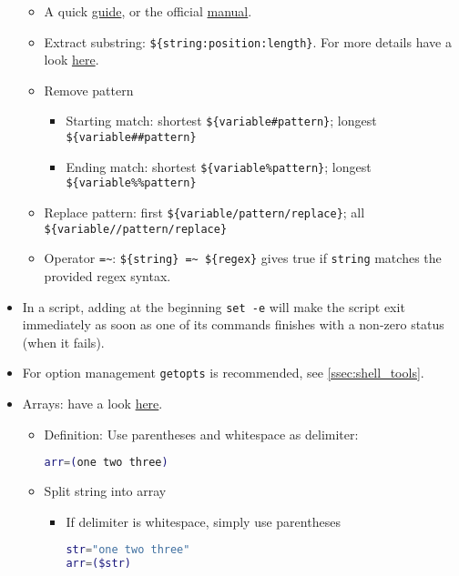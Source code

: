 \documentclass[a4paper,12pt,%
              final%
              ]{article}
\begin{document}
\begin{itemize}
    \begin{itemize}
      \item A quick \href{https://sookocheff.com/post/bash/bash-string-operators/}{guide}, or the official \href{https://www.gnu.org/software/bash/manual/html_node/Shell-Parameter-Expansion.html}{manual}.
      \item Extract substring: \verb|${string:position:length}|. For more details have a look \href{https://stackoverflow.com/questions/1405611/how-to-extract-the-first-two-characters-of-a-string-in-shell-scripting}{here}.
      \item Remove pattern
        \begin{itemize}
          \item Starting match: shortest \verb|${variable#pattern}|; longest \verb|${variable##pattern}|
          \item Ending match: shortest \verb|${variable%pattern}|; longest \verb|${variable%%pattern}|
        \end{itemize}
      \item Replace pattern: first \verb|${variable/pattern/replace}|; all \verb|${variable//pattern/replace}|
      \item Operator \verb|=~|: \verb|${string} =~ ${regex}| gives true if \verb|string| matches the provided regex syntax.
    \end{itemize}
  \item In a script, adding at the beginning \verb|set -e| will make the script exit immediately as soon as one of its commands finishes with a non-zero status (when it fails).
  \item For option management \verb|getopts| is recommended, see \autoref{ssec:shell_tools}.
  \item Arrays: have a look \href{https://opensource.com/article/18/5/you-dont-know-bash-intro-bash-arrays}{here}.
    \begin{itemize}
      \item Definition: Use parentheses and whitespace as delimiter:
\begin{lstlisting}[language=bash]
arr=(one two three)
\end{lstlisting}
      \item Split string into array
        \begin{itemize}
          \item If delimiter is whitespace, simply use parentheses
\begin{lstlisting}[language=bash]
str="one two three"
arr=($str)
\end{lstlisting}

\end{itemize}
\end{itemize}
\end{itemize}
\end{document}
